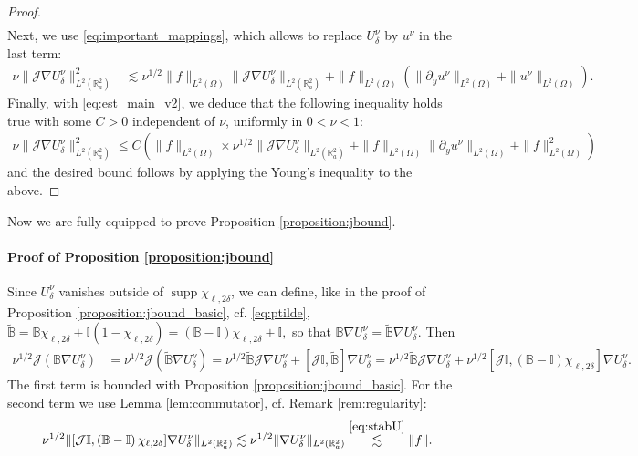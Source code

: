 \documentclass[report]{elsarticle}
\numberwithin{theorem}{section}
\begin{document}
\begin{proof}
\begin{align*}
\end{align*}
Next, we use \eqref{eq:important_mappings}, which allows to replace $U^{\nu}_{\delta}$ by $u^{\nu}$ in the last term:
\begin{align*}
	\nu\|\mathcal{J}\nabla U^{\nu}_{\delta}\|^2_{L^2(\mathbb{R}^2_a)}&\lesssim \nu^{1/2}\|f\|_{L^2(\Omega)}\|\mathcal{J}\nabla U^{\nu}_{\delta}\|_{L^2(\mathbb{R}^2_a)}+\|f\|_{L^2(\Omega)}\left(\|\partial_y u^{\nu}\|_{L^2(\Omega)}+\|u^{\nu}\|_{L^2(\Omega)}\right).
\end{align*}
Finally, with \eqref{eq:est_main_v2}, we deduce that the following inequality holds true with some $C>0$ independent of $\nu$, uniformly in $0<\nu<1$:
\begin{align*}
	\nu\|\mathcal{J}\nabla U^{\nu}_{\delta}\|^2_{L^2(\mathbb{R}^2_a)}\leq C( \|f\|_{L^2(\Omega)}\times \nu^{1/2}\|\mathcal{J}\nabla U^{\nu}_{\delta}\|_{L^2(\mathbb{R}^2_a)}+\|f\|_{L^2(\Omega)}\|\partial_y u^{\nu}\|_{L^2(\Omega)}+\|f\|^2_{L^2(\Omega)})
\end{align*}
and the desired bound follows by applying the Young's inequality to the above. 
\end{proof}
Now we are fully equipped to prove Proposition \ref{proposition:jbound}.
\paragraph{Proof of Proposition \ref{proposition:jbound}}
\label{proof_prop_jbound}
Since $U^{\nu}_{\delta}$ vanishes outside of $\operatorname{supp}\chi_{\ell,2\delta}$, we can define, like in the proof of Proposition \ref{proposition:jbound_basic}, cf. \eqref{eq:ptilde}, 
$
	\widetilde{\mathbb{B}}=\mathbb{B}\chi_{\ell,2\delta}+\mathbb{I}(1-\chi_{\ell,2\delta})=(\mathbb{B}-\mathbb{I})\chi_{\ell,2\delta}+\mathbb{I}, $
so that $\mathbb{B}\nabla U^{\nu}_{\delta}=\widetilde{\mathbb{B}}\nabla U^{\nu}_{\delta}$. Then 
\begin{align*}
	\nu^{1/2}\mathcal{J}(\mathbb{B}\nabla U^{\nu}_{\delta})&=	\nu^{1/2}\mathcal{J}(\widetilde{\mathbb{B}}\nabla U^{\nu}_{\delta})=\nu^{1/2}\widetilde{\mathbb{B}}\mathcal{J}\nabla U^{\nu}_{\delta}+
	[\mathcal{J}\mathbb{I}, \widetilde{\mathbb{B}}]\nabla U^{\nu}_{\delta}=\nu^{1/2}\widetilde{\mathbb{B}}\mathcal{J}\nabla U^{\nu}_{\delta}+\nu^{1/2}[\mathcal{J}\mathbb{I}, \left(\mathbb{B}-\mathbb{I}\right)\chi_{\ell,2\delta}]\nabla U^{\nu}_{\delta}.
\end{align*}
The first term is bounded with Proposition \ref{proposition:jbound_basic}. For the second term we use Lemma \ref{lem:commutator}, cf.  Remark \ref{rem:regularity}: $$\nu^{1/2}\|[\mathcal{J}\mathbb{I}, \left(\mathbb{B}-\mathbb{I}\right)\chi_{\ell,2\delta}]\nabla U^{\nu}_{\delta}\|_{L^2(\mathbb{R}^2_a)}\lesssim \nu^{1/2}\|\nabla U^{\nu}_{\delta}\|_{L^2(\mathbb{R}^2_a)}\overset{\eqref{eq:stabU}}{\lesssim}\|f\|.$$
\end{document}
